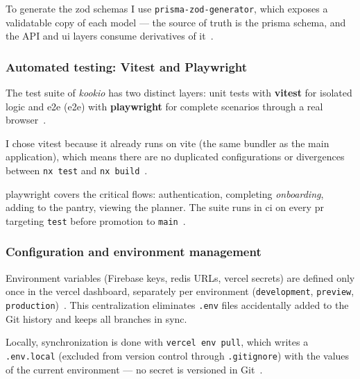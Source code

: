 To generate the \gls{zod} schemas I use \texttt{prisma-zod-generator}, which exposes a validatable copy of each model --- the source of truth is the \gls{prisma} schema, and the API and \acrshort{ui} layers consume derivatives of it~\cite{prisma_zod_generator}.

\subsubsection{Automated testing: Vitest and Playwright}\label{subsec:testare}

The test suite of \textit{\gls{kookio}} has two distinct layers: unit tests with \textbf{\gls{vitest}} for isolated logic and \acrlong{e2e} (\acrshort{e2e}) with \textbf{\gls{playwright}} for complete scenarios through a real browser~\cite{vitest,playwright}.

I chose \gls{vitest} because it already runs on \gls{vite} (the same bundler as the main application), which means there are no duplicated configurations or divergences between \texttt{nx test} and \texttt{nx build}~\cite{vitest,vite}.

\gls{playwright} covers the critical flows: authentication, completing \textit{onboarding}, adding to the pantry, viewing the planner.
The suite runs in \acrshort{ci} on every \acrshort{pr} targeting \texttt{test} before promotion to \texttt{main}~\cite{playwright}.

\subsubsection{Configuration and environment management}\label{subsec:configuratie}

Environment variables (Firebase keys, \gls{redis} URLs, \gls{vercel} secrets) are defined only once in the \gls{vercel} dashboard, separately per environment (\texttt{development}, \texttt{preview}, \texttt{production})~\cite{vercel_cli}.
This centralization eliminates \texttt{.env} files accidentally added to the Git history and keeps all branches in sync.

Locally, synchronization is done with \texttt{vercel env pull}, which writes a \texttt{.env.local} (excluded from version control through \texttt{.gitignore}) with the values of the current environment --- no secret is versioned in Git~\cite{vercel_cli}.
